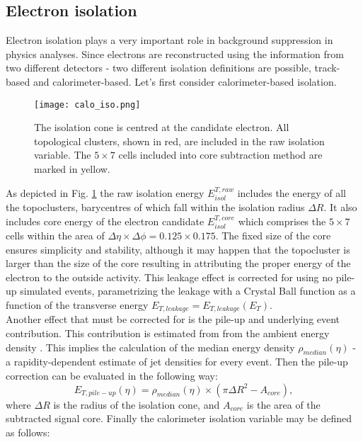     \subsection{Electron isolation}
    Electron isolation plays a very important role in background suppression in physics analyses. Since electrons are reconstructed using the information from two different detectors - two different isolation definitions are possible, track-based and calorimeter-based. Let's first consider calorimeter-based isolation.\\
	 \begin{figure}[htbp]
		\centering
		\texttt{[image: calo\_iso.png]}
		\caption[Isolation plot]{The isolation cone is centred at the candidate electron. All topological clusters, shown in red, are included in the raw isolation variable. The $5\times 7$ cells included into core subtraction method are marked in yellow.}
		\label{fig::calo_iso}
	\end{figure}
	As depicted in Fig. \ref{fig::calo_iso} the raw isolation energy $E_{isol}^{T,raw}$ includes the energy of all the topoclusters, barycentres of which fall within the isolation radius $\Delta R$. It also includes core energy of the electron candidate $E_{isol}^{T,core}$ which comprises the $5\times 7$ cells within the area of $\Delta \eta \times \Delta \phi = 0.125 \times 0.175$. The fixed size of the core ensures simplicity and stability, although it may happen that the topocluster is larger than the size of the core resulting in attributing the proper energy of the electron to the outside activity. This leakage effect is corrected for using no pile-up simulated events, parametrizing the leakage with a Crystal Ball function as a function of the transverse energy $E_{T,leakage}=E_{T,leakage}(E_T)$.\\
	Another effect that must be corrected for is the pile-up and underlying event contribution. This contribution is estimated from from the ambient energy density \cite{Cacciari:2007fd}. This implies the calculation of the median energy density $\rho_{median}(\eta)$ - a rapidity-dependent estimate of jet densities for every event. Then the pile-up correction can be evaluated in the following way:
	\begin{equation}
		E_{T,pile-up}(\eta)=\rho_{median}(\eta)\times(\pi \Delta R^2 - A_{core}),
	\end{equation}
	where $\Delta R$ is the radius of the isolation cone, and $A_{core}$ is the area of the subtracted signal core. Finally the calorimeter isolation variable may be defined as follows:

